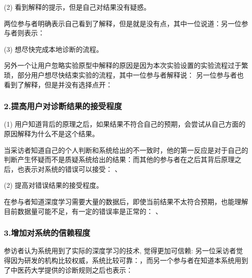 (2) 看到解释的提示，但是自己对结果没有疑惑。

两位参与者明确表示自己看到了解释，但是就是没有点，其中一位说道：另一位参与者则表示：


(3) 想尽快完成本地诊断的流程。

另外一个让用户忽略实验原型中解释的原因是因为本次实验设置的实验流程过于繁琐，部分用户想尽快结束实验的流程，其中一位参与者解释说：
另一位参与者也看到了解释，但是并没有选择点开：

\subsubsection{2.提高用户对诊断结果的接受程度}

(1) 用户知道背后的原理之后，如果结果不符合自己的预期，会尝试从自己方面的原因解释为什么不是这个结果。

当采访者知道自己的个人判断和系统给出的不一致时，他的第一反应是对于自己的判断产生怀疑而不是质疑系统给出的结果：而其他的参与者在之后其背后原理之后，也表示对系统的错误可以接受：
、


(2) 提高对错误结果的接受程度。

在参与者知道深度学习需要大量的数据后，即使当前结果不太符合预期，也能理解目前数据量可能不足，有一定的错误率是正常的：
、

\subsubsection{3.增加对系统的信赖程度}

参访者认为系统用到了实际的深度学习的技术, 觉得更加可信赖:
另一位采访者觉得因为研发的机构比较权威，系统比较可靠：，而另一个参与者在知道本系统用到了中医药大学提供的诊断规则之后也表示：

